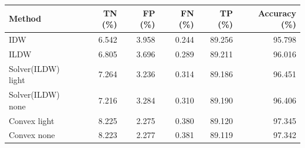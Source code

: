 \begin{tabular}{lrrrrr}\toprule
Method & TN (\%) & FP (\%) & FN (\%) & TP (\%) & Accuracy (\%) \\ \midrule
IDW & 6.542 & 3.958 & 0.244 & 89.256 & 95.798 \\
ILDW & 6.805 & 3.696 & 0.289 & 89.211 & 96.016 \\
Solver(ILDW) light & 7.264 & 3.236 & 0.314 & 89.186 & 96.451 \\
Solver(ILDW) none & 7.216 & 3.284 & 0.310 & 89.190 & 96.406 \\
Convex light & 8.225 & 2.275 & 0.380 & 89.120 & 97.345 \\
Convex none & 8.223 & 2.277 & 0.381 & 89.119 & 97.342 \\
\bottomrule\end{tabular}
